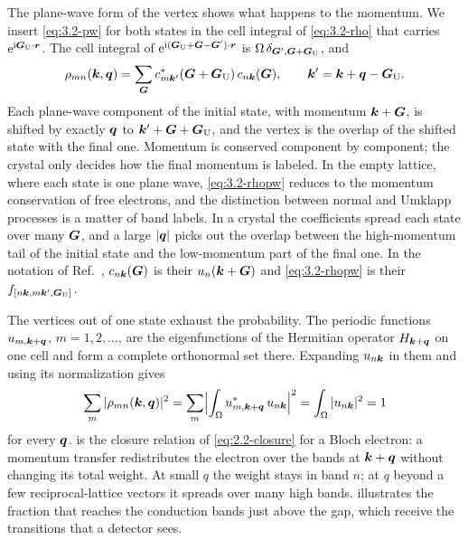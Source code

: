 The plane-wave form of the vertex shows what happens to the momentum. We insert \cref{eq:3.2-pw} for both states in the cell integral of \cref{eq:3.2-rho} that carries $\mathrm{e}^{\mathrm{i}\bm{G}_{\mathrm{U}}\cdot\bm{r}}$. The cell integral of $\mathrm{e}^{\mathrm{i}(\bm{G}_{\mathrm{U}} + \bm{G} - \bm{G}')\cdot\bm{r}}$ is $\Omega\,\delta_{\bm{G}',\bm{G}+\bm{G}_{\mathrm{U}}}$, and
\begin{equation}
  \rho_{mn}(\bm{k},\bm{q}) = \sum_{\bm{G}}c^*_{m\bm{k}'}(\bm{G} + \bm{G}_{\mathrm{U}})\,c_{n\bm{k}}(\bm{G}),
  \qquad \bm{k}' = \bm{k} + \bm{q} - \bm{G}_{\mathrm{U}} .
  \label{eq:3.2-rhopw}
\end{equation}
Each plane-wave component of the initial state, with momentum $\bm{k} + \bm{G}$, is shifted by exactly $\bm{q}$ to $\bm{k}' + \bm{G} + \bm{G}_{\mathrm{U}}$, and the vertex is the overlap of the shifted state with the final one. Momentum is conserved component by component; the crystal only decides how the final momentum is labeled. In the empty lattice, where each state is one plane wave, \cref{eq:3.2-rhopw} reduces to the momentum conservation of free electrons, and the distinction between normal and Umklapp processes is a matter of band labels. In a crystal the coefficients spread each state over many $\bm{G}$, and a large $|\bm{q}|$ picks out the overlap between the high-momentum tail of the initial state and the low-momentum part of the final one. In the notation of Ref.~\cite[Eqs.~(3.14)--(3.16)]{essig2016direct}, $c_{n\bm{k}}(\bm{G})$ is their $u_n(\bm{k} + \bm{G})$ and \cref{eq:3.2-rhopw} is their $f_{[n\bm{k},m\bm{k}',\bm{G}_{\mathrm{U}}]}$.

The vertices out of one state exhaust the probability. The periodic functions $u_{m,\bm{k}+\bm{q}}$, $m = 1, 2, \dots$, are the eigenfunctions of the Hermitian operator $H_{\bm{k}+\bm{q}}$ on one cell and form a complete orthonormal set there. Expanding $u_{n\bm{k}}$ in them and using its normalization gives
\begin{equation}
  \sum_m|\rho_{mn}(\bm{k},\bm{q})|^2 = \sum_m\Bigl|\int_\Omega u^*_{m,\bm{k}+\bm{q}}\,u_{n\bm{k}}\Bigr|^2 = \int_\Omega|u_{n\bm{k}}|^2 = 1
  \label{eq:3.2-closure}
\end{equation}
for every $\bm{q}$.  is the closure relation of \cref{eq:2.2-closure} for a Bloch electron: a momentum transfer redistributes the electron over the bands at $\bm{k} + \bm{q}$ without changing its total weight. At small $q$ the weight stays in band $n$; at $q$ beyond a few reciprocal-lattice vectors it spreads over many high bands.  illustrates the fraction that reaches the conduction bands just above the gap, which receive the transitions that a detector sees.

